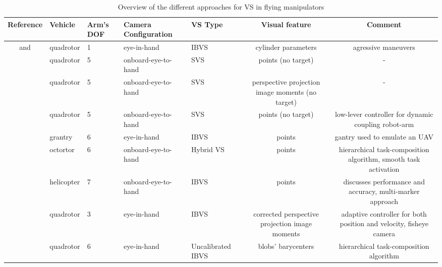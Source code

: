 \begin{table}
\setlength\extrarowheight{0.3pt} %
	\begin{tabularx}{\textwidth}{CPPBPCC}
		\toprule
		\textbf{Reference} & \textbf{Vehicle} & \textbf{Arm's DOF} & \textbf{Camera Configuration} & \textbf{VS Type} & \textbf{Visual feature} & \textbf{Comment} \\ 
		\midrule
		\cite{thomas_toward_2014} and \cite{thomas_visual_2016} & quadrotor  & 1 & eye-in-hand & IBVS & cylinder parameters & agressive maneuvers \\ 
		\cite{mebarki_image-based_2014} & quadrotor  & 5 & onboard-eye-to-hand  & SVS & points (no target) & - \\ 
		\cite{mebarki_exploiting_2013}  & quadrotor  & 5 & onboard-eye-to-hand  & SVS & perspective projection image moments (no target) & - \\ 
		\cite{mebarki_cross-coupled_2014} & quadrotor  & 5 & onboard-eye-to-hand  & SVS & points (no target) & low-lever controller for dynamic coupling robot-arm \\ 
		\cite{danko_evaluation_2014} & grantry & 6 & eye-in-hand & IBVS & points & gantry used to emulate an UAV \\ 
		\cite{lippiello_hybrid_2016} & octortor & 6 & onboard-eye-to-hand  & Hybrid VS & points & hierarchical task-composition algorithm, smooth task activation \\
		\cite{laiacker_high_2016} & helicopter & 7 & onboard-eye-to-hand  & IBVS & points & discusses performance and accuracy, multi-marker approach \\ 
		\cite{kim_vision-guided_2016} & quadrotor  & 3 & eye-in-hand & IBVS  & corrected perspective projection image moments & adaptive controller for both position and velocity, fisheye camera \\ 
		\cite{santamaria-navarro_uncalibrated_2017} & quadrotor  & 6 & eye-in-hand & Uncalibrated IBVS & blobs' barycenters & hierarchical task-composition algorithm \\
		\bottomrule
	\end{tabularx}
	\caption{Overview of the different approaches for VS in flying manipulators}
	\label{vs-manipulators-table}
\end{table}
